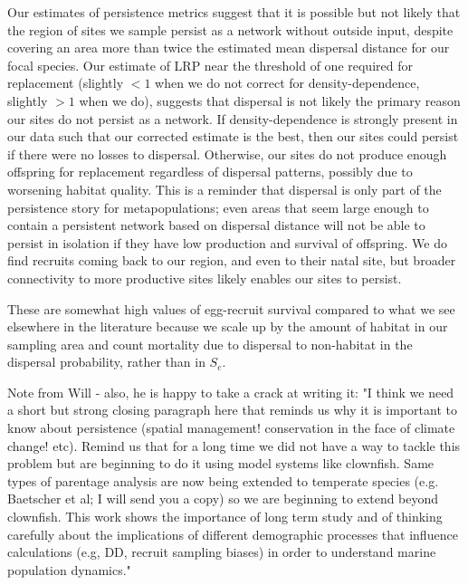 \documentclass[12pt, oneside]{article}   	%
\begin{document}
Our estimates of persistence metrics suggest that it is possible but not likely that the region of sites we sample persist as a network without outside input, despite covering an area more than twice the estimated mean dispersal distance for our focal species. Our estimate of LRP near the threshold of one required for replacement (slightly $ < 1$ when we do not correct for density-dependence, slightly $ > 1$ when we do), suggests that dispersal is not likely the primary reason our sites do not persist as a network. If density-dependence is strongly present in our data such that our corrected estimate is the best, then our sites could persist if there were no losses to dispersal. Otherwise, our sites do not produce enough offspring for replacement regardless of dispersal patterns, possibly due to worsening habitat quality. This is a reminder that dispersal is only part of the persistence story for metapopulations; even areas that seem large enough to contain a persistent network based on dispersal distance will not be able to persist in isolation if they have low production and survival of offspring. We do find recruits coming back to our region, and even to their natal site, but broader connectivity to more productive sites likely enables our sites to persist.

These are somewhat high values of egg-recruit survival compared to what we see elsewhere in the literature \citep[e.g.][]{rumrill_natural_1990, metaxas_quantifying_2009} \citep[though not unreasonable, e.g.][]{white2014planktonic, johnson2018integrating} because we scale up by the amount of habitat in our sampling area and count mortality due to dispersal to non-habitat in the dispersal probability, rather than in $S_e$. 


Note from Will - also, he is happy to take a crack at writing it: "I think we need a short but strong closing paragraph here that reminds us why it is important to know about persistence (spatial management! conservation in the face of climate change! etc). Remind us that for a long time we did not have a way to tackle this problem but are beginning to do it using model systems like clownfish. Same types of parentage analysis are now being extended to temperate species (e.g. Baetscher et al; I will send you a copy) so we are beginning to extend beyond clownfish. This work shows the importance of long term study and of thinking carefully about the implications of different demographic processes that influence calculations (e.g, DD, recruit sampling biases) in order to understand marine population dynamics."
\end{document}
